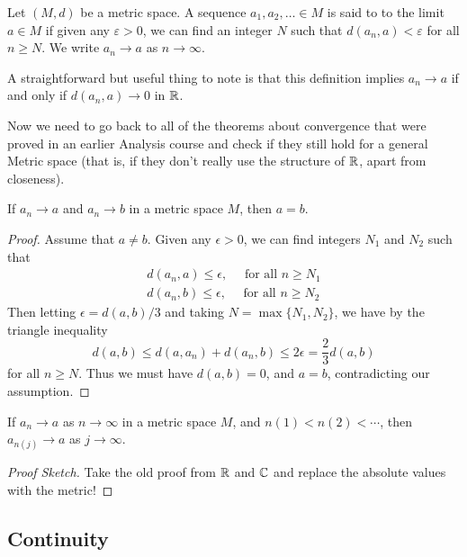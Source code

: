 \documentclass[a4paper]{scrartcl}
\begin{document}
\begin{definition}[Convergence]
    Let $(M, d)$ be a metric space. A sequence $a_1, a_2, \dots \in M$ is said to  to the limit $a \in M$ if given any $\varepsilon > 0$, we can find an integer $N$ such that $d(a_n, a) < \varepsilon$ for all $n \geq N$. We write $a_n \rightarrow a$ as $n \rightarrow \infty$.
\end{definition}

A straightforward but useful thing to note is that this definition implies $a_n \rightarrow a$ if and only if $d(a_n, a) \rightarrow 0$ in $\mathbb{R}$.

Now we need to go back to all of the theorems about convergence that were proved in an earlier Analysis course and check if they still hold for a general Metric space (that is, if they don't really use the structure of $\mathbb{R}$, apart from closeness).

\begin{lemma}
    If $a_n \rightarrow a$ and $a_n \rightarrow b$ in a metric space $M$, then $a = b$.
\end{lemma}
\begin{proof}
	Assume that $a \neq b$. Given any $\epsilon > 0$, we can find integers $N_1$ and $N_2$ such that
	\begin{align*}
		d(a_n, a) \leq \epsilon, \quad \text{ for all $n \geq N_1$}\\
		d(a_n, b) \leq \epsilon, \quad \text{ for all $n \geq N_2$}
	\end{align*}
	Then letting $\epsilon = d(a, b)/3$ and taking $N = \max\{N_1, N_2\}$, we have by the triangle inequality
	$$
	d(a, b) \leq d(a, a_n) + d(a_n, b) \leq 2\epsilon = \frac{2}{3} d(a, b)
	$$
	for all $n \geq N$.
	Thus we must have $d(a, b) = 0$, and $a = b$, contradicting our assumption.
\end{proof}

\begin{lemma}
    If $a_n \rightarrow a$ as $n \rightarrow \infty$ in a metric space $M$, and $n(1) < n(2) < \cdots$, then $a_{n(j)} \rightarrow a$ as $j \rightarrow \infty$.
\end{lemma}
\begin{proof}[Proof Sketch]
    Take the old proof from $\mathbb{R}$ and $\mathbb{C}$ and replace the absolute values with the metric!
\end{proof}

\subsection{Continuity}
\end{document}
